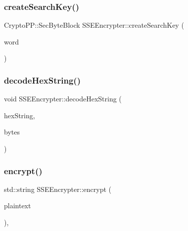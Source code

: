 \mbox{\label{classSSEEncrypter_ae81cc103149e1db15c577c8b474f9217}} 
\subsubsection{\texorpdfstring{create\+Search\+Key()}{createSearchKey()}}
{\footnotesize\ttfamily Crypto\+P\+P\+::\+Sec\+Byte\+Block S\+S\+E\+Encrypter\+::create\+Search\+Key (\begin{DoxyParamCaption}\item[{std\+::string \&}]{word }\end{DoxyParamCaption})}

\mbox{\label{classSSEEncrypter_a668394973e3f574ca24588c5a0763f5f}} 
\subsubsection{\texorpdfstring{decode\+Hex\+String()}{decodeHexString()}}
{\footnotesize\ttfamily void S\+S\+E\+Encrypter\+::decode\+Hex\+String (\begin{DoxyParamCaption}\item[{std\+::string \&}]{hex\+String,  }\item[{Crypto\+P\+P\+::\+Sec\+Byte\+Block \&}]{bytes }\end{DoxyParamCaption})\hspace{0.3cm}{\ttfamily [private]}}

\mbox{\label{classSSEEncrypter_ab13571d2a7a8875226bf8901cd080949}} 
\subsubsection{\texorpdfstring{encrypt()}{encrypt()}}
{\footnotesize\ttfamily std\+::string S\+S\+E\+Encrypter\+::encrypt (\begin{DoxyParamCaption}\item[{std\+::string \&}]{plaintext }\end{DoxyParamCaption})\hspace{0.3cm}{\ttfamily [override]}, {\ttfamily [virtual]}}



